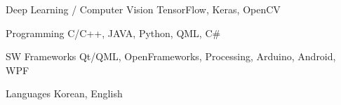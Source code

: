 


\begin{cvskills}

  \cvskill
    {Deep Learning / Computer Vision} %
    {TensorFlow, Keras, OpenCV} %

  \cvskill
    {Programming} %
    {C/C++, JAVA, Python, QML, C\#} %

  \cvskill
    {SW Frameworks} %
    {Qt/QML, OpenFrameworks, Processing, Arduino, Android, WPF} %

  \cvskill
    {Languages} %
    {Korean, English} %

\end{cvskills}
